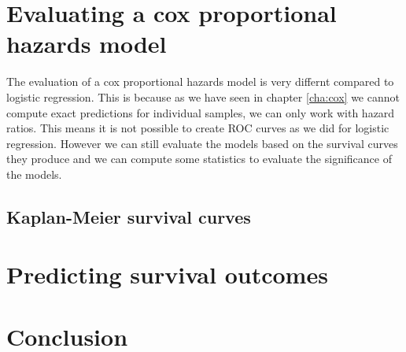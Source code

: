 \section{Evaluating a cox proportional hazards model}
\label{sec:evaluation-coxph}
The evaluation of a cox proportional hazards model is very differnt compared to logistic regression. This is because as we have seen in chapter \ref{cha:cox} we cannot compute exact predictions for individual samples, we can only work with hazard ratios. This means it is not possible to create ROC curves as we did for logistic regression. However we can still evaluate the models based on the survival curves they produce and we can compute some statistics to evaluate the significance of the models.

\subsection{Kaplan-Meier survival curves}
 
\section{Predicting survival outcomes}
\label{sec:evaluation-predictingsurvival}

\section{Conclusion}
\label{sec:evaluation-conclusion}
